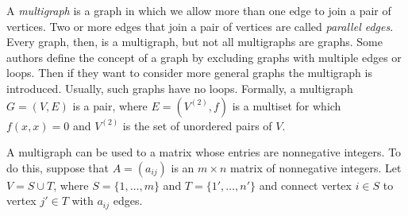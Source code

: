 \documentclass{article}
\begin{document}
A \emph{multigraph} is a graph in which we allow more than one edge to join a pair of vertices. Two or more edges that join a pair of vertices are called \emph{parallel edges}. Every graph, then, is a multigraph, but not all multigraphs are graphs.
Some authors define the concept of a graph by excluding graphs with multiple 
edges or loops. Then if they want to consider more general graphs the 
multigraph is introduced. Usually, such graphs have no loops.
Formally, a multigraph $G=(V,  E)$ is a pair, where $E=(V^{(2)}, f)$
is a multiset for which $f(x,x) = 0$ and $V^{(2)}$ is the set of unordered pairs
of $V$.

A multigraph can be used to  a matrix whose entries are nonnegative integers. To do this, suppose that $A=(a_{ij})$ is an $m\times n$
matrix of nonnegative integers. 
Let $V=S \cup T$, where $S=\{1, \ldots , m\}$ and 
$T =\{1', \ldots , n'\}$ and connect vertex $i\in S$ to vertex $j'\in T$ with $a_{ij}$
edges. 
 
\end{document}
